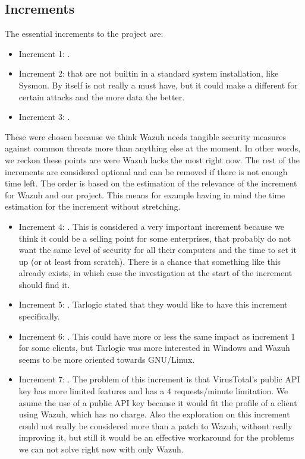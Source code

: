 \subsection{Increments}
The essential increments to the project are:
\begin{itemize}
	\item Increment 1: \IncrementoUno.
	\item Increment 2: \IncrementoDos that are not builtin in a standard system installation, like Sysmon. By itself is not really a must have, but it could make a different for certain attacks and the more data the better.
	\item Increment 3: \IncrementoTres.
\end{itemize}
\linej
These were chosen because we think Wazuh needs tangible security measures against common threats more than anything else at the moment. In other words, we reckon these points are were Wazuh lacks the most right now.
\linej
\linej
The rest of the increments are considered optional and can be removed if there is not enough time left. The order is based on the estimation of the relevance of the increment for Wazuh and our project. This means for example having in mind the time estimation for the increment without stretching.
\begin{itemize}
	\item Increment 4: \IncrementoCuatro. This is considered a very important increment because we think it could be a selling point for some enterprises, that probably do not want the same level of security for all their computers and the time to set it up (or at least from scratch). There is a chance that something like this already exists, in which case the investigation at the start of the increment should find it.
	\item Increment 5: \IncrementoCinco. Tarlogic stated that they would like to have this increment specifically.
	\item Increment 6: \IncrementoSeis. This could have more or less the same impact as increment 1 for some clients, but Tarlogic was more interested in Windows and Wazuh seems to be more oriented towards GNU/Linux.
	\item Increment 7: \IncrementoSiete. The problem of this increment is that VirusTotal's public API key has more limited features and has a 4 requests/minute limitation\cite{virustotal_faq}. We asume the use of a public API key because it would fit the profile of a client using Wazuh, which has no charge. Also the exploration on this increment could not really be considered more than a patch to Wazuh, without really improving it, but still it would be an effective workaround for the problems we can not solve right now with only Wazuh.
\end{itemize}


